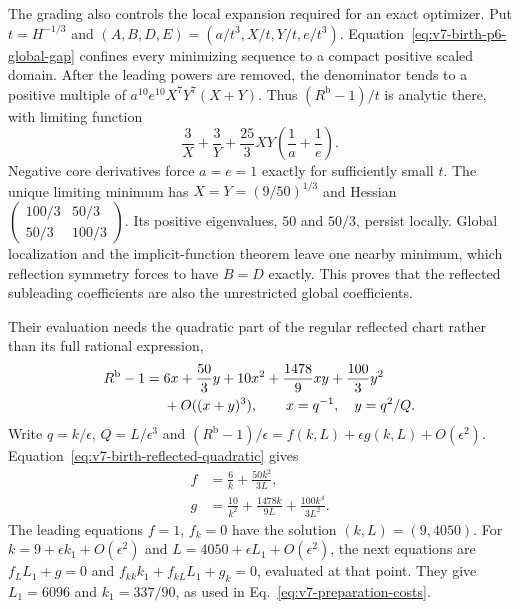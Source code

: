 \documentclass[aps,pre,reprint,amsmath,amssymb,longbibliography]{revtex4-2}
\begin{document}
The grading also controls the local expansion required for an exact
optimizer. Put $t=H^{-1/3}$ and
$(A,B,D,E)=(a/t^3,X/t,Y/t,e/t^3)$. Equation~\eqref{eq:v7-birth-p6-global-gap} confines every minimizing sequence
to a compact positive scaled domain. After the leading powers are
removed, the denominator tends to a positive multiple of
$a^{10}e^{10}X^7Y^7(X+Y)$. Thus
$(R^{\mathrm b}-1)/t$ is analytic there, with limiting function
\begin{equation}
 \frac3X+\frac3Y+
 \frac{25}{3}XY\left(\frac1a+\frac1e\right).
 \label{eq:v7-birth-scaled-objective}
\end{equation}
Negative core derivatives force $a=e=1$ exactly for sufficiently
small $t$. The unique limiting minimum has
$X=Y=(9/50)^{1/3}$ and Hessian
$\left(\begin{smallmatrix}100/3&50/3\\50/3&100/3\end{smallmatrix}\right)$.
Its positive eigenvalues, $50$ and $50/3$, persist locally. Global
localization and the implicit-function theorem leave one nearby
minimum, which reflection symmetry forces to have $B=D$ exactly.
This proves that the reflected subleading coefficients are also the
unrestricted global coefficients.

Their evaluation needs the quadratic part of the regular reflected
chart rather than its full rational expression,
 \begin{align}
 R^{\mathrm b}-1={}&6x+\frac{50}{3}y+10x^2
       +\frac{1478}{9}xy+\frac{100}{3}y^2  \label{eq:v7-birth-reflected-quadratic}\\
       &+O((x+y)^3),\qquad x=q^{-1},\quad y=q^2/Q. \notag
 \end{align}
Write $q=k/\epsilon$, $Q=L/\epsilon^3$ and
$(R^{\mathrm b}-1)/\epsilon=f(k,L)+\epsilon g(k,L)+O(\epsilon^2)$.
Equation~\eqref{eq:v7-birth-reflected-quadratic} gives
\begin{equation}
 \begin{aligned}
 f&=\frac6k+\frac{50k^2}{3L},\\
 g&=\frac{10}{k^2}+\frac{1478k}{9L}+
                         \frac{100k^4}{3L^2}.
 \end{aligned}
 \label{eq:v7-birth-optimizer-expansion}
\end{equation}
The leading equations $f=1$, $f_k=0$ have the solution
$(k,L)=(9,4050)$. For
$k=9+\epsilon k_1+O(\epsilon^2)$ and
$L=4050+\epsilon L_1+O(\epsilon^2)$, the next equations are
$f_LL_1+g=0$ and
$f_{kk}k_1+f_{kL}L_1+g_k=0$, evaluated at that point.
They give $L_1=6096$ and $k_1=337/90$, as used in
Eq.~\eqref{eq:v7-preparation-costs}.
\end{document}
